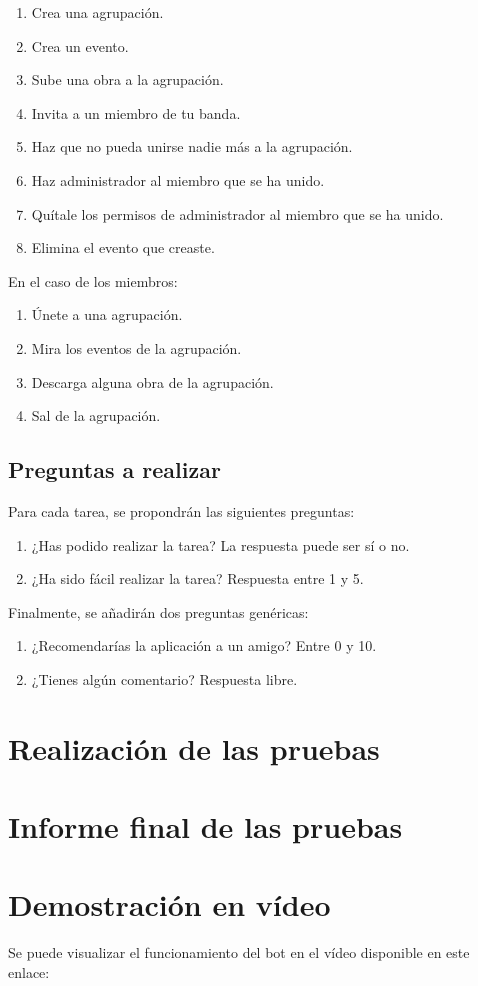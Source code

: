 \begin{enumerate}
    \item Crea una agrupación.
    \item Crea un evento.
    \item Sube una obra a la agrupación.
    \item Invita a un miembro de tu banda.
    \item Haz que no pueda unirse nadie más a la agrupación.
    \item Haz administrador al miembro que se ha unido.
    \item Quítale los permisos de administrador al miembro que se ha unido.
    \item Elimina el evento que creaste.
\end{enumerate}

En el caso de los miembros:

\begin{enumerate}
    \item Únete a una agrupación.
    \item Mira los eventos de la agrupación.
    \item Descarga alguna obra de la agrupación.
    \item Sal de la agrupación.
\end{enumerate}


\subsection{Preguntas a realizar}

Para cada tarea, se propondrán las siguientes preguntas:
\begin{enumerate}
    \item ¿Has podido realizar la tarea? La respuesta puede ser sí o no.
    \item ¿Ha sido fácil realizar la tarea? Respuesta entre 1 y 5.
\end{enumerate}

Finalmente, se añadirán dos preguntas genéricas:

\begin{enumerate}
    \item ¿Recomendarías la aplicación a un amigo? Entre 0 y 10.
    \item ¿Tienes algún comentario? Respuesta libre.
\end{enumerate}

\section{Realización de las pruebas}


\section{Informe final de las pruebas}



\section{Demostración en vídeo}

Se puede visualizar el funcionamiento del bot en el vídeo disponible en este enlace:
\url{}

